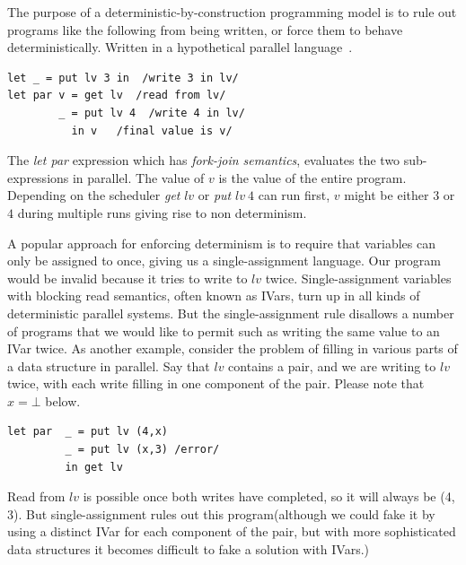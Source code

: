 \documentclass[twocolumn]{article}
\begin{document}
The purpose of a deterministic-by-construction programming model is to rule out programs like the following from being written, or force them to behave deterministically. Written in a hypothetical parallel language~\cite{lindsey}. 
\begin{verbatim}
let _ = put lv 3 in  /write 3 in lv/
let par v = get lv  /read from lv/
        _ = put lv 4  /write 4 in lv/
	      in v   /final value is v/
\end{verbatim} 
The \textit{let par} expression which has \textit{fork-join semantics}, evaluates the two sub-expressions in parallel. The value of $v$ is the value of the entire program. Depending on the scheduler \textit{get} $lv$ or \textit{put} $lv\ 4$ can run first, $v$ might be either $3$ or $4$ during multiple runs giving rise to non determinism.\par
A popular approach for enforcing determinism is to require that variables can only be assigned to once, giving us a single-assignment language. Our program would be invalid because it tries to write to $lv$ twice. Single-assignment variables with blocking read semantics, often known as IVars, turn up in all kinds of deterministic parallel systems. But the single-assignment rule disallows a number of programs that we would like to permit such as writing the same value to an IVar twice. As another example, consider the problem of filling in various parts of a data structure in parallel. \cite{lindsey}Say that $lv$ contains a pair, and we are writing to $lv$ twice, with each write filling in one component of the pair. Please note that $x=\bot$ below.\par 
\begin{verbatim}
let par  _ = put lv (4,x)
         _ = put lv (x,3) /error/
         in get lv
\end{verbatim}  
Read from $lv$ is possible once both writes have completed, so it will always be (4, 3). But single-assignment rules out this program(although we could fake it by using a distinct IVar for each component of the pair, but with more sophisticated data structures it becomes difficult to fake a solution with IVars.)\par
\end{document}
